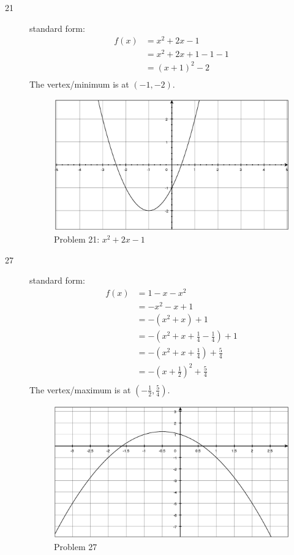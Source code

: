 \documentclass{exam}
\begin{document}
\begin{description}
    \item[21]
      standard form:
      \begin{align*}
        f(x) &= x^2 + 2x - 1 \\
          &= x^2 + 2x + 1 - 1 - 1 \\
          &= (x + 1)^2 - 2 \\
      \end{align*}
      The vertex/minimum is at $(-1, -2)$.

      \begin{figure}[H]
        \centering
        \includegraphics[scale=.3]{problem_21.eps}
        \caption*{Problem 21: $x^2 + 2x - 1$}
      \end{figure}

    \item[27]
      standard form:
      \begin{align*}
        f(x) &= 1 - x - x^2 \\
          &= -x^2 - x + 1 \\
          &= -(x^2 + x) + 1 \\
          &= -\left( x^2 + x + \frac{1}{4} - \frac{1}{4} \right) + 1 \\
          &= -\left( x^2 + x + \frac{1}{4} \right) + \frac{5}{4} \\
          &= - \left( x + \frac{1}{2} \right)^2 + \frac{5}{4} \\
      \end{align*}
      The vertex/maximum is at $\left( -\frac{1}{2}, \frac{5}{4} \right)$.

      \begin{figure}[H]
        \centering
        \includegraphics[scale=.3]{problem_27.eps}
        \caption*{Problem 27}
      \end{figure}


\end{description}
\end{document}
